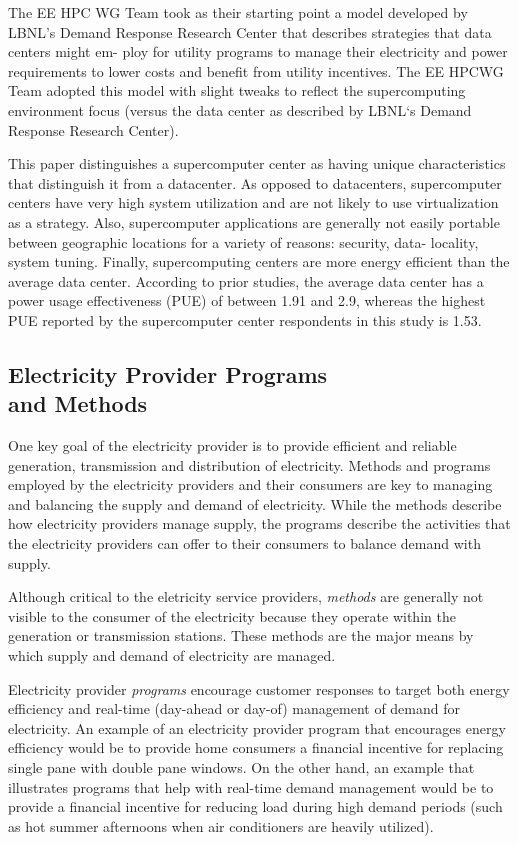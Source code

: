 The EE HPC WG Team took as their starting point a
model developed by LBNL's Demand Response Research
Center that describes strategies that data centers might em-
ploy for utility programs to manage their electricity and
power requirements to lower costs and benefit from utility
incentives. The EE HPCWG Team adopted this model with
slight tweaks to reflect the supercomputing environment
focus (versus the data center as described by LBNL`s Demand
Response Research Center).

This paper distinguishes a supercomputer center as
having unique characteristics that distinguish it from 
a datacenter. As opposed to datacenters, supercomputer
centers have very high system utilization and are not likely
to use virtualization as a strategy. Also, supercomputer
applications are generally not easily portable between
geographic locations for a variety of reasons: security, data-
locality, system tuning.  Finally, supercomputing centers are 
more energy efficient than the average data center.
According to prior studies,
the average data center has a power usage effectiveness (PUE)
of between 1.91 and 2.9, whereas the highest PUE reported by the
supercomputer center respondents in this study is 1.53.

\subsection{Electricity Provider Programs\\
and Methods}
\label{sub:EPP}
One key goal of the electricity provider is to provide efficient and reliable generation, transmission and 
distribution of electricity. Methods and programs employed by the electricity providers and their consumers 
are key to managing and balancing the supply and demand of electricity. While the methods describe how 
electricity providers manage supply, the programs describe the activities that the electricity providers 
can offer to their consumers to balance demand with supply.

Although critical to the eletricity service providers, \textit{methods} 
are generally not visible to the consumer of the electricity because they
operate within the generation  or transmission stations.
These methods are the major means by which supply and demand of electricity are managed.

Electricity provider \textit{programs} encourage customer responses to target both energy efficiency and real-time
(day-ahead or day-of) management of demand for electricity. An example of an electricity provider program 
that encourages energy efficiency would be to provide home consumers a financial incentive for replacing 
single pane with double pane windows.  On the other hand, an example that illustrates programs that help 
with real-time demand management would be to provide a financial incentive for reducing load during high demand periods 
(such as hot summer afternoons when air conditioners are heavily utilized). 

